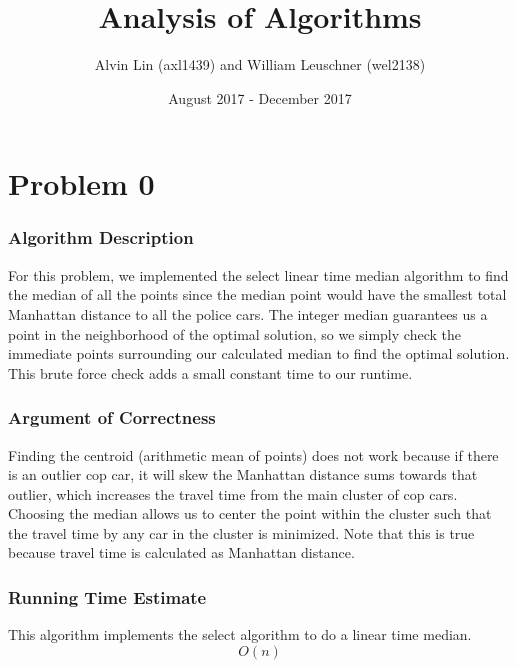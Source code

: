 \documentclass[letterpaper, 12pt]{math}
\title{Analysis of Algorithms}
\author{Alvin Lin (axl1439) and William Leuschner (wel2138)}
\date{August 2017 - December 2017}
\begin{document}
\maketitle

\section*{Problem 0}

\subsubsection*{Algorithm Description}
For this problem, we implemented the select linear time median algorithm to
find the median of all the points since the median point would have the smallest
total Manhattan distance to all the police cars. The integer median guarantees
us a point in the neighborhood of the optimal solution, so we simply check the
immediate points surrounding our calculated median to find the optimal solution.
This brute force check adds a small constant time to our runtime.

\subsubsection*{Argument of Correctness}
Finding the centroid (arithmetic mean of points) does not work because if there
is an outlier cop car, it will skew the Manhattan distance sums towards that
outlier, which increases the travel time from the main cluster of cop cars.
Choosing the median allows us to center the point within the cluster such that
the travel time by any car in the cluster is minimized. Note that this is true
because travel time is calculated as Manhattan distance.

\subsubsection*{Running Time Estimate}
This algorithm implements the select algorithm to do a linear time median.
\[ O(n) \]
\end{document}
